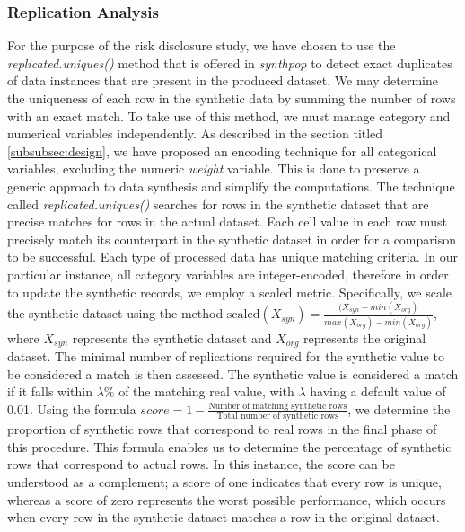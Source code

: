 \subsubsection{Replication Analysis}
\label{subsubsec:sde}
For the purpose of the risk disclosure study, we have chosen to use the \textit{replicated.uniques()} method that is offered in \textit{synthpop} to detect exact duplicates of data instances that are present in the produced dataset. We may determine the uniqueness of each row in the synthetic data by summing the number of rows with an exact match. To take use of this method, we must manage category and numerical variables independently. As described in the section titled \ref{subsubsec:design}, we have proposed an encoding technique for all categorical variables, excluding the numeric \textit{weight} variable. This is done to preserve a generic approach to data synthesis and simplify the computations. The technique called \textit{replicated.uniques()} searches for rows in the synthetic dataset that are precise matches for rows in the actual dataset. Each cell value in each row must precisely match its counterpart in the synthetic dataset in order for a comparison to be successful. Each type of processed data has unique matching criteria. In our particular instance, all category variables are integer-encoded, therefore in order to update the synthetic records, we employ a scaled metric. Specifically, we scale the synthetic dataset using the method $\text{scaled}(X_{syn})=\frac{(X_{syn}-min(X_{org})}{max(X_{org})-min(X_{org})}$, where $X_{syn}$ represents the synthetic dataset and $X_{org}$ represents the original dataset. The minimal number of replications required for the synthetic value to be considered a match is then assessed. The synthetic value is considered a match if it falls within $\lambda\%$ of the matching real value, with $\lambda$ having a default value of 0.01. Using the formula $score=1-\frac{\text{Number of matching synthetic rows}}{\text{Total number of synthetic rows}}$, we determine the proportion of synthetic rows that correspond to real rows in the final phase of this procedure. This formula enables us to determine the percentage of synthetic rows that correspond to actual rows. In this instance, the score can be understood as a complement; a score of one indicates that every row is unique, whereas a score of zero represents the worst possible performance, which occurs when every row in the synthetic dataset matches a row in the original dataset.


